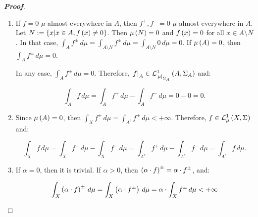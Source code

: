 \begin{proposition}
\begin{proof}[\rm\textbf{Proof}]
\begin{enumerate}
    \begin{equation}
        \begin{split}
          \int_{X}{f^+\,d\mu} & =\int_{N^c}{f^+\,d\mu}\leq\int_{N^c}{g^+\,d\mu}=\int_{X}{g^+\,d\mu},\\\\
          \int_{X}{f^-\,d\mu} & =\int_{N^c}{f^-\,d\mu}\geq\int_{N^c}{g^-\,d\mu}=\int_{X}{g^-\,d\mu},
        \end{split}
    \end{equation}

    Therefore:

    \begin{equation}
        \int_{X}{f\,d\mu}=\int_{X}{f^+\,d\mu}-\int_{X}{f^-\,d\mu}\leq\int_{X}{g^+\,d\mu}-\int_{X}{g^-\,d\mu}=\int_{X}{g\,d\mu}.
    \end{equation}
      \item If $f=0$ $\mu$-almost everywhere in $A$, then $f^+,f^-=0$ $\mu$-almost everywhere in $A$. Let $N:=\set{x\middle|x\in A,f\pr{x}\neq 0}$. Then $\mu\pr{N}=0$ and $f\pr{x}=0$ for all $x\in A\setminus N$. In that case, $\int_{A}{f^\pm\,d\mu}=\int_{A\setminus N}{f^\pm\,d\mu}=\int_{A\setminus N}{0\,d\mu}=0$. If $\mu\pr{A}=0$, then $\int_{A}{f^\pm\,d\mu}=0$. 
      
      In any case, $\int_{A}{f^\pm\,d\mu}=0$. Therefore, $\rest{f}{A}\in\Leb{A}{\Sigma_A}{\rest{\mu}{\Sigma_A}}$ and:
      
      \begin{equation}
        \int_{A}{f\,d\mu}=\int_{A}{f^+\,d\mu}-\int_{A}{f^-\,d\mu}=0-0=0.
      \end{equation}

      \item Since $\mu\pr{A}=0$, then $\int_{X}{f^\pm\,d\mu}=\int_{A^c}{f^\pm\,d\mu}<+\infty$. Therefore, $f\in\Leb{X}{\Sigma}{\mu}$ and:
      
      \begin{equation}
        \int_{X}{f\,d\mu}=\int_{X}{f^+\,d\mu}-\int_{X}{f^-\,d\mu}=\int_{A^c}{f^+\,d\mu}-\int_{A^c}{f^-\,d\mu}=\int_{A^c}{f\,d\mu}.
      \end{equation}
      \item If $\alpha=0$, then it is trivial. If $\alpha>0$, then $\pr{\alpha\cdot f}^\pm=\alpha\cdot f^\pm$, and:
      
      \begin{equation}
        \int_{X}{\pr{\alpha\cdot f}^\pm\,d\mu}=\int_{X}{\pr{\alpha\cdot f^\pm}\,d\mu}=\alpha\cdot\int_{X}{f^\pm\,d\mu}<+\infty
      \end{equation}


\end{enumerate}
\end{proof}
\end{proposition}
